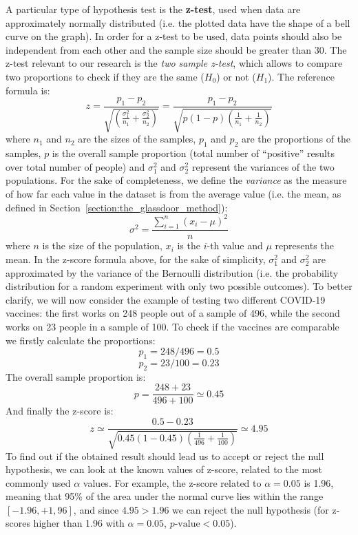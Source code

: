 A particular type of hypothesis test is the \textbf{z-test}, used when data are approximately normally distributed (i.e. the plotted data have the shape of a bell curve on the graph). In order for a z-test to be used, data points should also be independent from each other and the sample size should be greater than 30. The z-test relevant to our research is the \textit{two sample z-test}, which allows to compare two proportions to check if they are the same (\(H_0\)) or not (\(H_1\)). The reference formula is: \[z = \frac{p_1 - p_2}{\sqrt{(\frac{\sigma_1^2}{n_1} + \frac{\sigma_2^2}{n_2})}} = \frac{p_1 - p_2}{\sqrt{p(1 - p)(\frac{1}{n_1} + \frac{1}{n_2})}}\] where \(n_1\) and \(n_2\) are the sizes of the samples, \(p_1\) and \(p_2\) are the proportions of the samples, \(p\) is the overall sample proportion (total number of ``positive'' results over total number of people) and \(\sigma_1^2\) and \(\sigma_2^2\) represent the variances of the two populations. For the sake of completeness, we define the \textit{variance} as the measure of how far each value in the dataset is from the average value (i.e. the mean, as defined in Section~\ref{section:the_glassdoor_method}): \[\sigma^2 = \frac{\sum\limits_{i=1}^n (x_i - \mu)^2}{n}\] where \(n\) is the size of the population, \(x_i\) is the \(i\)-th value and \(\mu\) represents the mean. In the z-score formula above, for the sake of simplicity, \(\sigma_1^2\) and \(\sigma_2^2\) are approximated by the variance of the Bernoulli distribution (i.e. the probability distribution for a random experiment with only two possible outcomes). To better clarify, we will now consider the example of testing two different COVID-19 vaccines: the first works on 248 people out of a sample of 496, while the second works on 23 people in a sample of 100. To check if the vaccines are comparable we firstly calculate the proportions: \[p_1 = 248 / 496 = 0.5\] \[p_2 = 23 / 100 = 0.23\]
The overall sample proportion is: \[p = \frac{248 + 23}{496 + 100} \simeq 0.45\]
And finally the z-score is: \[z \simeq \frac{0.5 - 0.23}{\sqrt{0.45(1 - 0.45)(\frac{1}{496} + \frac{1}{100})}} \simeq 4.95\]
To find out if the obtained result should lead us to accept or reject the null hypothesis, we can look at the known values of z-score, related to the most commonly used \(\alpha\) values. For example, the z-score related to \(\alpha = 0.05\) is 1.96, meaning that 95\% of the area under the normal curve lies within the range \([-1.96, +1,96]\), and since \(4.95 > 1.96\) we can reject the null hypothesis (for z-scores higher than 1.96 with \(\alpha = 0.05\), \(p\textrm{-value} < 0.05\)).


